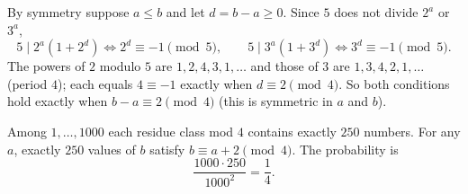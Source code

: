 By symmetry suppose $a\le b$ and let $d=b-a\ge0$. Since $5$ does not divide $2^a$ or $3^a$,
\[
5\mid 2^a(1+2^d)\iff 2^d\equiv-1\pmod5,\qquad 5\mid 3^a(1+3^d)\iff 3^d\equiv-1\pmod5 .
\]
The powers of $2$ modulo $5$ are $1,2,4,3,1,\ldots$ and those of $3$ are $1,3,4,2,1,\ldots$ (period $4$); each equals $4\equiv-1$ exactly when $d\equiv2\pmod4$. So both conditions hold exactly when $b-a\equiv2\pmod4$ (this is symmetric in $a$ and $b$).

Among $1,\ldots,1000$ each residue class mod $4$ contains exactly $250$ numbers. For any $a$, exactly $250$ values of $b$ satisfy $b\equiv a+2\pmod4$. The probability is
\[
\dfrac{1000\cdot250}{1000^2}=\boxed{\dfrac{1}{4}}.
\]
